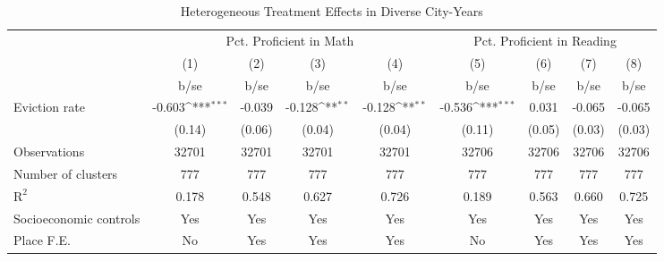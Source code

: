 \begin{table}[htbp]\centering
\def\sym#1{\ifmmode^{#1}\else\(^{#1}\)\fi}
\caption{Heterogeneous Treatment Effects in Diverse City-Years}
\begin{tabular}{l*{8}{c}}
\toprule
                    &\multicolumn{4}{c}{Pct. Proficient in Math}                                            &\multicolumn{4}{c}{Pct. Proficient in Reading}                                         \\\cmidrule(lr){2-5}\cmidrule(lr){6-9}
                    &\multicolumn{1}{c}{(1)}         &\multicolumn{1}{c}{(2)}         &\multicolumn{1}{c}{(3)}         &\multicolumn{1}{c}{(4)}         &\multicolumn{1}{c}{(5)}         &\multicolumn{1}{c}{(6)}         &\multicolumn{1}{c}{(7)}         &\multicolumn{1}{c}{(8)}         \\
                    &        b/se         &        b/se         &        b/se         &        b/se         &        b/se         &        b/se         &        b/se         &        b/se         \\
\midrule
Eviction rate       &      -0.603\sym{***}&      -0.039         &      -0.128\sym{**} &      -0.128\sym{**} &      -0.536\sym{***}&       0.031         &      -0.065         &      -0.065         \\
                    &      (0.14)         &      (0.06)         &      (0.04)         &      (0.04)         &      (0.11)         &      (0.05)         &      (0.03)         &      (0.03)         \\
\midrule
Observations        &       32701         &       32701         &       32701         &       32701         &       32706         &       32706         &       32706         &       32706         \\
Number of clusters  &         777         &         777         &         777         &         777         &         777         &         777         &         777         &         777         \\
$\text{R}^2$        &       0.178         &       0.548         &       0.627         &       0.726         &       0.189         &       0.563         &       0.660         &       0.725         \\
Socioeconomic controls&         Yes         &         Yes         &         Yes         &         Yes         &         Yes         &         Yes         &         Yes         &         Yes         \\
Place F.E.          &          No         &         Yes         &         Yes         &         Yes         &          No         &         Yes         &         Yes         &         Yes         \\

\end{tabular}
\end{table}

